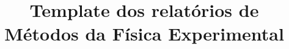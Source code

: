 \documentclass{article}
\begin{document}
	\title{Template dos relatórios de Métodos da Física Experimental}
	
	
	
	\begin{titlepage}
		\begin{center}
				 \begin{figure}[!ht]
				\centering
				

\end{figure}
\end{center}
\end{titlepage}
\end{document}
